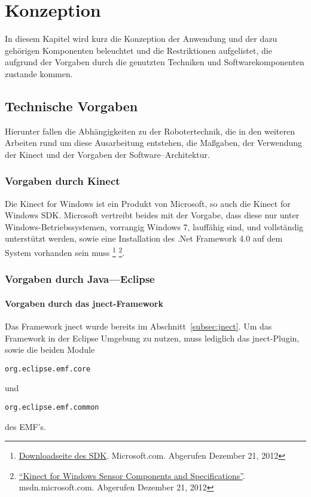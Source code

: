 \chapter{Konzeption}
\label{chap:Konzeption}

In diesem Kapitel wird kurz die Konzeption der Anwendung und der dazu geh\"origen Komponenten beleuchtet und die Restriktionen aufgelistet, die aufgrund der Vorgaben durch die genutzten Techniken und Softwarekomponenten zustande kommen.

\section{Technische Vorgaben}
Hierunter fallen die Abh\"angigkeiten zu der Robotertechnik, die in den weiteren Arbeiten rund um diese Ausarbeitung entstehen, die Ma\ss gaben, der Verwendung der Kinect und der Vorgaben der Software--Architektur.

\subsection{Vorgaben durch Kinect}
Die Kinect for Windows ist ein Produkt von Microsoft, so auch die Kinect for Windows \acrshort{SDK}. Microsoft vertreibt beides mit der Vorgabe, dass diese nur unter Windows-Betriebssystemen, vorrangig Windows 7, lauff\"ahig sind, und vollst\"andig unterst\"utzt werden, sowie eine Installation des .Net Framework 4.0 auf dem System vorhanden sein muss \footnote{\href{https://www.microsoft.com/en-us/kinectforwindows/develop/}{Downloadseite des SDK}. Microsoft.com. Abgerufen Dezember 21, 2012} \footnote{\href{http://msdn.microsoft.com/en-us/library/jj131033.aspx}{\enquote{Kinect for Windows Sensor Components and Specifications}}. msdn.microsoft.com. Abgerufen Dezember 21, 2012}.

\subsection{Vorgaben durch Java---Eclipse}
\label{subsec:vorgabeJava}

\subsubsection{Vorgaben durch das jnect-Framework}
Das Framework jnect wurde bereits im Abschnitt~\ref{subsec:jnect}. Um das \gls{Framework} in der Eclipse Umgebung zu nutzen, muss lediglich das jnect-Plugin, sowie die beiden Module \begin{verbatim}org.eclipse.emf.core\end{verbatim} und \begin{verbatim}org.eclipse.emf.common\end{verbatim} des \gls{EMF}'s.

